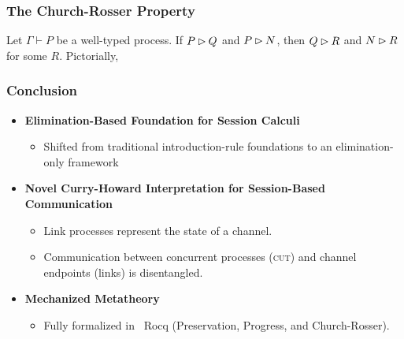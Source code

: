 \documentclass[11pt, aspectratio=169, xcolor={dvipsnames}, usepdftitle=false]{beamer}
\newcommand{\zb}[2][1em]{\makebox[#1]{$\displaystyle#2$}}
\begin{document}
\begin{frame}[fragile]
  \frametitle{The Church-Rosser Property}
  \begin{theorem}
    Let $\Gamma \vdash P$ be a well-typed process.
    If $P \rhd Q$ and $P \rhd N$, then $Q \rhd R$ and $N \rhd R$ for some $R$.
    Pictorially,
    \begin{center}
    \end{center}
  \end{theorem}
\end{frame}

\begin{frame}
  \frametitle{Conclusion}

  \begin{itemize}
    \item \textbf{Elimination-Based Foundation for Session Calculi}
      \begin{itemize}
        \item Shifted from traditional introduction-rule foundations to an elimination-only framework
      \end{itemize}

    \bigskip

    \item \textbf{Novel Curry-Howard Interpretation for Session-Based Communication}
      \begin{itemize}
        \item Link processes represent the state of a channel.
        \item Communication between concurrent processes (\textsc{cut}) and channel endpoints (links) is disentangled.
      \end{itemize}

    \bigskip

    \item \textbf{Mechanized Metatheory}
      \begin{itemize}
        \item Fully formalized in \rocqicon~Rocq (Preservation, Progress, and Church-Rosser).
      \end{itemize}
  \end{itemize}
\end{frame}
\end{document}
